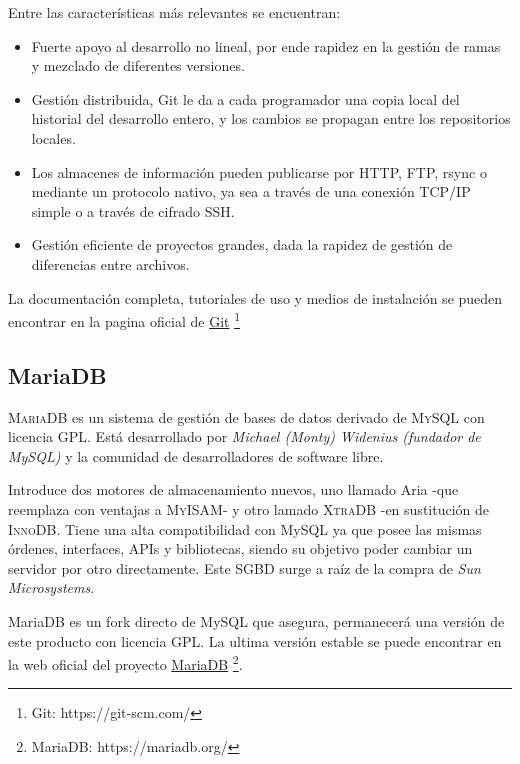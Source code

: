 \documentclass[12pt]{book} %
\begin{document}
		Entre las características más relevantes se encuentran:
		\begin{multicols}{2}
			\begin{itemize}
				\item Fuerte apoyo al desarrollo no lineal, por ende rapidez en la gestión de ramas y mezclado de diferentes versiones. 
				\item Gestión distribuida, Git le da a cada programador una copia local del historial del desarrollo entero, y los 
				cambios se propagan entre los repositorios locales. 
				\item Los almacenes de información pueden publicarse por HTTP, FTP, rsync o mediante un protocolo nativo, ya sea a través 
				de una conexión TCP/IP simple o a través de cifrado SSH.
				\item Gestión eficiente de proyectos grandes, dada la rapidez de gestión de diferencias entre archivos.
			\end{itemize}
		\end{multicols}
		
		La documentación completa, tutoriales de uso y medios de instalación se pueden encontrar en la pagina oficial de 
		\href{https://git-scm.com/}{Git} \footnote{\scriptsize Git: https://git-scm.com/}
	
		
	\subsection{MariaDB \label{maria}}
		\textsc{MariaDB} es un sistema de gestión de bases de datos derivado de \textsc{MySQL} con licencia \textsc{GPL}. 
		Está desarrollado por \textit{Michael (Monty) Widenius (fundador de MySQL)} y la comunidad de desarrolladores de software 
		libre. 
		
		Introduce dos motores de almacenamiento nuevos, uno llamado Aria -que reemplaza con ventajas a \textsc{MyISAM}- y otro
		lamado \textsc{XtraDB} -en sustitución de \textsc{InnoDB}. Tiene una alta compatibilidad con MySQL ya que posee las mismas
		órdenes, interfaces, APIs y bibliotecas, siendo su objetivo poder cambiar un servidor por otro directamente. 
		Este \textsc{SGBD} surge a raíz de la compra de \textit{Sun Microsystems}.
		
		MariaDB es un fork directo de MySQL que asegura, permanecerá una versión de este producto con licencia GPL. 
		La ultima versión estable se puede encontrar en la web oficial del proyecto \href{https://mariadb.org/}{MariaDB} 
		\footnote{\scriptsize MariaDB: https://mariadb.org/}.
		
\end{document}
